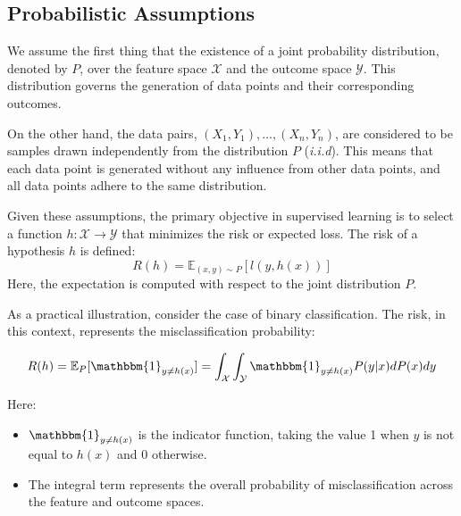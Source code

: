 \documentclass[11pt]{article}
\begin{document}
    \subsection{Probabilistic Assumptions}

    We assume the first thing that the existence of a joint probability distribution, denoted by $P$, over the feature space $\mathcal{X}$ and the outcome space $\mathcal{Y}$. This distribution governs the generation of data points and their corresponding outcomes.

    On the other hand, the data pairs, $(X_1, Y_1), \dots, (X_n, Y_n)$, are considered to be samples drawn independently from the distribution $P$ (\textit{i.i.d}). This means that each data point is generated without any influence from other data points, and all data points adhere to the same distribution.

    Given these assumptions, the primary objective in supervised learning is to select a function \( h : \mathcal{X} \rightarrow \mathcal{Y} \) that minimizes the risk or expected loss. The risk of a hypothesis \( h \) is defined:
    \begin{equation}
        R(h) = \mathbb{E}_{(x, y) \sim P}[l(y, h(x))]
    \end{equation}
    Here, the expectation is computed with respect to the joint distribution \( P \).

    As a practical illustration, consider the case of binary classification. The risk, in this context, represents the misclassification probability:

    \begin{equation}
        R(h) = \mathbb{E}_P[\mathbbm{1}_{y \neq h(x)}] = \int_{\mathcal{X}} \int_{\mathcal{Y}} \mathbbm{1}_{y \neq h(x)} P(y|x) dP(x) dy
    \end{equation}

    Here:
    \begin{itemize}
        \item \( \mathbbm{1}_{y \neq h(x)} \) is the indicator function, taking the value 1 when \( y \) is not equal to \( h(x) \) and 0 otherwise.
        \item The integral term represents the overall probability of misclassification across the feature and outcome spaces.
    \end{itemize}
\end{document}
